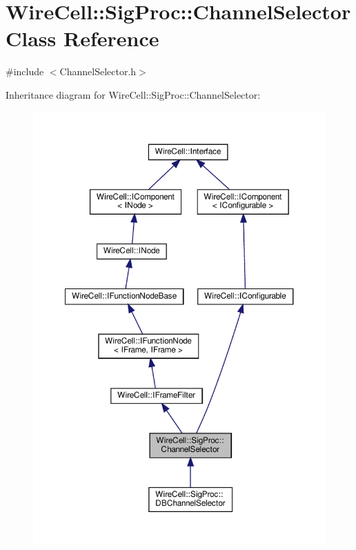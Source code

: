 \hypertarget{class_wire_cell_1_1_sig_proc_1_1_channel_selector}{}\section{Wire\+Cell\+:\+:Sig\+Proc\+:\+:Channel\+Selector Class Reference}
\label{class_wire_cell_1_1_sig_proc_1_1_channel_selector}


{\ttfamily \#include $<$Channel\+Selector.\+h$>$}



Inheritance diagram for Wire\+Cell\+:\+:Sig\+Proc\+:\+:Channel\+Selector\+:
\nopagebreak
\begin{figure}[H]
\begin{center}
\leavevmode
\includegraphics[width=350pt]{class_wire_cell_1_1_sig_proc_1_1_channel_selector__inherit__graph}
\end{center}
\end{figure}


